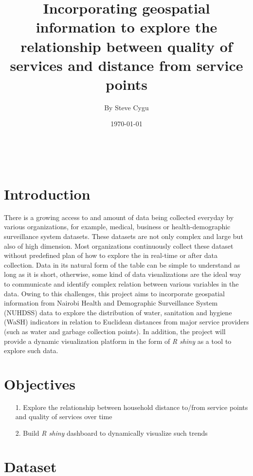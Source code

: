 \documentclass[12pt]{article}
\begin{document}
\title{\textbf{Incorporating geospatial information to explore the relationship between quality of services and distance from service points}}
\author{By Steve Cygu}\\
\date{\today}
\maketitle

\section*{Introduction}

There is a growing access to and amount of data being collected everyday by various organizations, for example, medical, business or health-demographic surveillance system datasets. These datasets are not only complex and large but also of high dimension. Most organizations continuously collect these dataset without predefined plan of how to explore the in real-time or after data collection. Data in its natural form of the table can be simple to understand as long as it is short, otherwise, some kind of data visualizations are the ideal way to communicate and identify complex relation between various variables in the data. Owing to this challenges, this project aims to incorporate geospatial information from Nairobi Health and Demographic Surveillance System (NUHDSS) data to explore the distribution of water, sanitation and hygiene (WaSH) indicators in relation to Euclidean distances from major service providers (such as water and garbage collection points). In addition, the project will provide a dynamic visualization platform in the form of \textit{R shiny} as a tool to explore such data.


\section*{Objectives}

\begin{itemize}
\item[1.] Explore the relationship between household distance to/from service points and quality of services over time
\item[2.] Build \textit{R shiny} dashboard to dynamically visualize such trends
\end{itemize}

\section*{Dataset}
\end{document}
